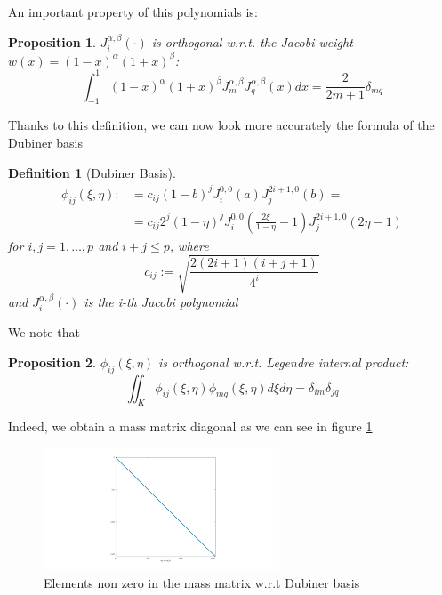 \documentclass[a4paper,12pt]{article}
\newtheorem{definition}{Definition}
\newtheorem{prop}{Proposition}
\begin{document}
    An important property of this polynomials is:
    \begin{prop}
    $J_i^{\alpha,\beta}(\cdot)$ is orthogonal w.r.t. the Jacobi weight $w(x)=(1-x)^\alpha(1+x)^\beta$:
    \begin{equation}
    \int_{-1}^{1}{(1-x)^\alpha(1+x)^\beta J_m^{\alpha,\beta} J_q^{\alpha,\beta}(x)dx}=\frac{2}{2m+1} \delta_{mq} 
    \end{equation}
    \end{prop}
    
    Thanks to this definition, we can now look more accurately the formula of the Dubiner basis
    \begin{definition}[Dubiner Basis]
    \begin{equation}
    \begin{split}
    \phi_{ij}(\xi,\eta) :&= c_{ij}(1-b)^j J_i^{0,0}(a) J_j^{2i+1,0}(b)=
    \\&=c_{ij} 2^j (1-\eta)^j J_i^{0,0}(\frac{2\xi}{1-\eta}-1) J_j^{2i+1,0} (2\eta-1)
    \end{split}
    \end{equation}
    for $i,j=1,\dots,p$ and $i+j \le p$, where
    \begin{equation}
    c_{ij} := \sqrt{\frac{2(2i+1)(i+j+1)}{4^i}}
    \end{equation}
    and $J_i^{\alpha,\beta}(\cdot)$ is the i-th Jacobi polynomial
    \end{definition}
    
    We note that
    \begin{prop}
    $\phi_{ij}(\xi,\eta)$ is orthogonal w.r.t. Legendre internal product:
    \begin{equation}
    \iint_{\hat{K}}{\phi_{ij}(\xi,\eta)\phi_{mq}(\xi,\eta) d\xi d\eta}=\delta_{im}\delta_{jq}
    \end{equation}
    \end{prop}
    
    Indeed, we obtain a mass matrix diagonal as we can see in figure \ref{mass}
    
    \begin{figure}[ht]
    \begin{center}
    \includegraphics[width = 7cm]{./mass_dubiner.jpg}
    	\caption{Elements non zero in the mass matrix w.r.t Dubiner basis}
    	\label{mass}
    \end{center}
    \end{figure}
    
    \newpage
    \printbibliography
\end{document}
